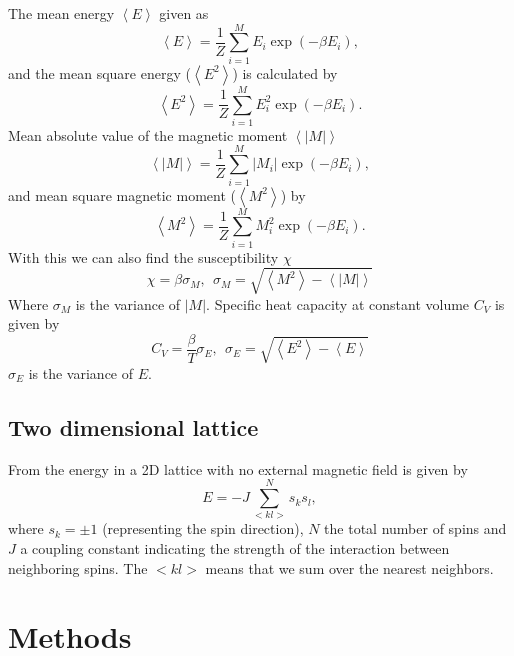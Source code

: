 \documentclass[reprint, english,notitlepage,nofootinbib]{revtex4-1}  %
\begin{document}
The mean energy $\left<E\right>$ given as
\begin{equation}
	\label{eq:expected_energy}
	\left<E\right> = \frac{1}{Z} \sum_{i=1}^{M}E_i\exp(-\beta E_i),
\end{equation}
and the mean square energy ($\left<E^2\right>$) is calculated by
\begin{equation}
	\label{eq:expected_energy_sq}
	\left<E^2\right> = \frac{1}{Z} \sum_{i=1}^{M}E_i^2\exp(-\beta E_i).
\end{equation}
Mean absolute value of the magnetic moment $\left<|M|\right>$
\begin{equation}
	\label{eq:expected_magnetic_moment}
	\left<|M|\right> = \frac{1}{Z} \sum_{i=1}^{M}|M_i|\exp(-\beta E_i),
\end{equation}
and mean square magnetic moment ($\left<M^2\right>$) by
\begin{equation}
\label{eq:expected_magnetic_moment_sq}
\left<M^2\right> = \frac{1}{Z} \sum_{i=1}^{M}M_i^2\exp(-\beta E_i).
\end{equation}
With this we can also find the susceptibility $\chi$
\begin{equation}
	\label{eq:magnetic_susceptibility}
	\chi = \beta \sigma_M, \ \ \sigma_M = \sqrt{\left<M^2\right> - \left<|M|\right>}
\end{equation}
Where $\sigma_M$ is the variance of $|M|$. Specific heat capacity at constant volume $C_V$ is given by
\begin{equation}
	\label{eq:specific_heat_capacity}
	C_V = \frac{\beta}{T}\sigma_E, \ \ \sigma_E = \sqrt{\left<E^2\right> - \left<E\right>}
\end{equation}
$\sigma_E$ is the variance of $E$.

\subsection*{Two dimensional lattice} \label{sect:2by2Lattice}

From \cite{oppgavetekst} the energy in a 2D lattice with no external magnetic field is given by
\begin{equation}
	\label{eq:2D_energy}
	E = -J \sum_{<kl>}^{N}s_ks_l,
\end{equation}
where $s_k = \pm 1$ (representing the spin direction), $N$ the total number of spins and $J$ a coupling constant indicating the strength of the interaction between neighboring spins. The $<kl>$ means that we sum over the nearest neighbors.

\section{Methods}
\end{document}

